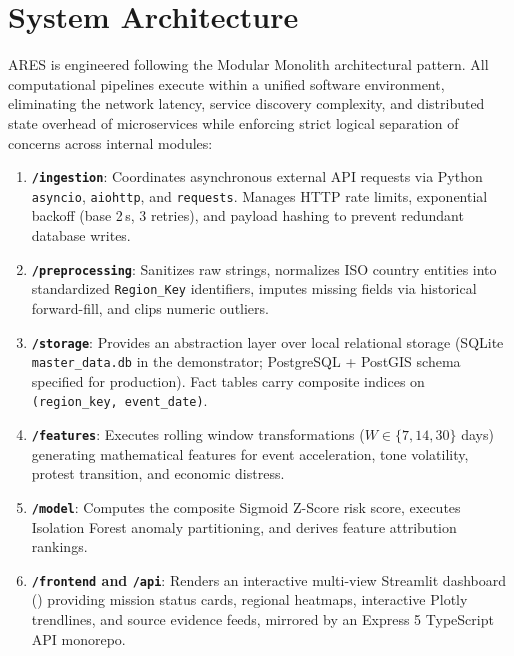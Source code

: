 \documentclass[preprint,12pt]{elsarticle}
\begin{document}
\section{System Architecture}
\label{sec:arch}

ARES is engineered following the Modular Monolith architectural pattern. All computational pipelines execute within a unified software environment, eliminating the network latency, service discovery complexity, and distributed state overhead of microservices while enforcing strict logical separation of concerns across internal modules:

\begin{enumerate}
    \item \textbf{\texttt{/ingestion}}: Coordinates asynchronous external API requests via Python \texttt{asyncio}, \texttt{aiohttp}, and \texttt{requests}. Manages HTTP rate limits, exponential backoff (base 2\,s, 3 retries), and payload hashing to prevent redundant database writes.
    \item \textbf{\texttt{/preprocessing}}: Sanitizes raw strings, normalizes ISO country entities into standardized \texttt{Region\_Key} identifiers, imputes missing fields via historical forward-fill, and clips numeric outliers.
    \item \textbf{\texttt{/storage}}: Provides an abstraction layer over local relational storage (SQLite \texttt{master\_data.db} in the demonstrator; PostgreSQL + PostGIS schema specified for production). Fact tables carry composite indices on \texttt{(region\_key, event\_date)}.
    \item \textbf{\texttt{/features}}: Executes rolling window transformations ($W \in \{7, 14, 30\}$ days) generating mathematical features for event acceleration, tone volatility, protest transition, and economic distress.
    \item \textbf{\texttt{/model}}: Computes the composite Sigmoid Z-Score risk score, executes Isolation Forest anomaly partitioning, and derives feature attribution rankings.
    \item \textbf{\texttt{/frontend} and \texttt{/api}}: Renders an interactive multi-view Streamlit dashboard () providing mission status cards, regional heatmaps, interactive Plotly trendlines, and source evidence feeds, mirrored by an Express 5 TypeScript API monorepo.
\end{enumerate}
\end{document}
